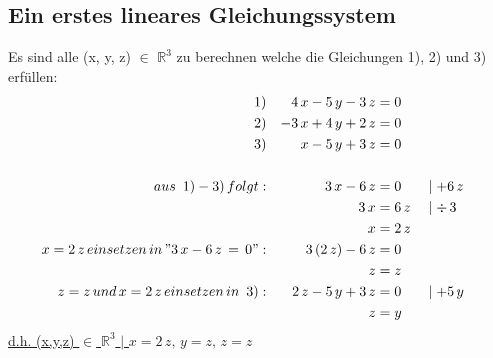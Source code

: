 \documentclass[titlepage]{article}
\begin{document}
		\subsection*{Ein erstes lineares Gleichungssystem}
		Es sind alle (x, y, z) $\in$ $\mathbb{R}^3$ zu berechnen welche die Gleichungen 1), 2) und 3) erfüllen:
		\begin{align*}
			1)&& 4\,x-5\,y-3\,z &=0 \\
			2)&& -3\,x+4\,y+2\,z &=0 \\
			3)&& x-5\,y+3\,z &=0\\
			\\
			aus\,\,\,1)-3)\,folgt:&& 3\,x-6\,z &= 0 &&\mid +6\,z\\
			&& 3\,x &= 6\,z &&\mid \div\,3\\
			&& x &= 2\,z\\
			x = 2\,z\,einsetzen\,in\,"3\,x-6\,z\,=\,0":&& 3\,(2\,z)-6\,z &= 0\\
			&& z &= z\\
			z=z\,und\,x=2\,z\,einsetzen\,in\,\,\,3):&& 2\,z-5\,y+3\,z &= 0 &&\mid +5\,y\\
			&& z &= y
		\end{align*}
		\underline{\underline{d.h. (x,y,z) $\in$ $\mathbb{R}^3$ $\mid$ $x=2\,z,\,y=z,\,z=z$}}
		
\end{document}
